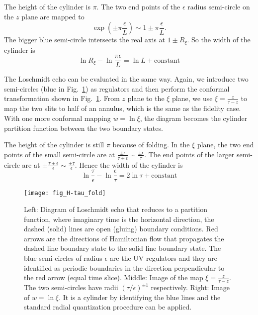 The height of the cylinder is $\pi$. The two end points of the $\epsilon$ radius semi-circle on the $z$ plane are mapped to
\begin{equation}
\exp( \pm \pi \frac{\epsilon}{ L}  ) \sim 1 \pm \pi \frac{\epsilon}{L} .
\end{equation}
The bigger blue semi-circle intersects the real axis at $1 \pm R_{\xi}$. So the width of the cylinder is 
\begin{equation}
\label{eq:fidel_cyd_width}
\ln R_{\xi} - \ln \frac{\pi \epsilon}{L} = \ln L + \text{constant} 
\end{equation}

The Loschmidt echo can be evaluated in the same way. Again, we introduce two semi-circles (blue in Fig.~\ref{fig:H-tau_fold}) as regulators and then perform the conformal transformation shown in Fig.~\ref{fig:H-tau_fold}. From $z$ plane to the $\xi$ plane, we use $\xi = \frac{z}{\tau - z}$ to map the two slits to half of an annulus, which is the same as the fidelity case. With one more conformal mapping $w = \ln \xi$, the diagram becomes the cylinder partition function between the two boundary states. 

The height of the cylinder is still $\pi$ because of folding. In the $\xi$ plane, the two end points of the small semi-circle are at $\frac{\pm \epsilon}{ \tau \pm \epsilon} \sim \frac{\pm \epsilon}{ \tau }$. The end points of the larger semi-circle are at $\pm \frac{\tau \pm \epsilon}{\epsilon} \sim \frac{\pm \tau}{\epsilon}$. Hence the width of the cylinder is
\begin{equation}
\label{eq:echo_cyd_width}
\ln \frac{\tau}{\epsilon} - \ln \frac{\epsilon}{\tau } = 2 \ln \tau + \text{constant} 
\end{equation}

\begin{figure}[htb]
\centering
\texttt{[image: fig\_H-tau\_fold]}
\caption{Left: Diagram of Loschmidt echo that reduces to a partition function, where imaginary time is the horizontal direction, the dashed (solid) lines are open (gluing) boundary conditions. Red arrows are the directions of Hamiltonian flow that propagates the dashed line boundary state to the solid line boundary state. The blue semi-circles of radius $\epsilon$ are the UV regulators and they are identified as periodic boundaries in the direction perpendicular to the red arrow (equal time slice). Middle: Image of the map $\xi = \frac{z}{\tau - z}$. {\color{red}The two semi-circles have radii $({\tau}/{\epsilon})^{\pm1}$ respectively.}  Right: Image of $w = \ln \xi$. It is a cylinder by identifying the blue lines and the standard radial quantization procedure can be applied. }
\label{fig:H-tau_fold}
\end{figure}

